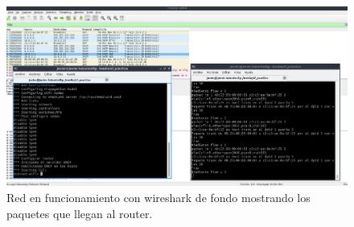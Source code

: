 \begin{figure}[!h]
    \centering
    \includegraphics[width=\textwidth]{imagenes/figuras/red_funcionando.png}
    \caption{Red en funcionamiento con wireshark de fondo mostrando los paquetes que llegan al router.}
    \label{fig:red-funcionando}
\end{figure}
